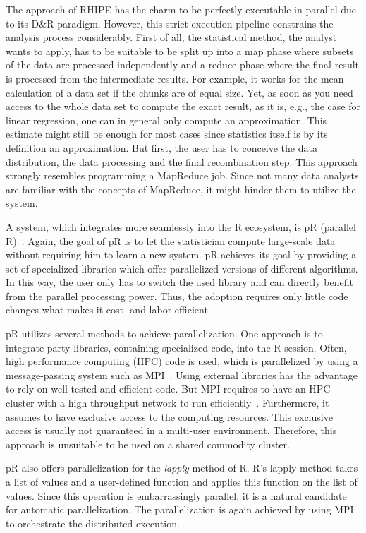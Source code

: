 The approach of RHIPE has the charm to be perfectly executable in parallel due to its D\&R paradigm.
However, this strict execution pipeline constrains the analysis process considerably.
First of all, the statistical method, the analyst wants to apply, has to be suitable to be split up into a map phase where subsets of the data are processed independently and a reduce phase where the final result is processed from the intermediate results.
For example, it works for the mean calculation of a data set if the chunks are of equal size.
Yet, as soon as you need access to the whole data set to compute the exact result, as it is, e.g., the case for linear regression, one can in general only compute an approximation.
This estimate might still be enough for most cases since statistics itself is by its definition an approximation.
But first, the user has to conceive the data distribution, the data processing and the final recombination step.
This approach strongly resembles programming a MapReduce job.
Since not many data analysts are familiar with the concepts of MapReduce, it might hinder them to utilize the system.

A system, which integrates more seamlessly into the R ecosystem, is pR (parallel R)~\cite{samatova:2009a}.
Again, the goal of pR is to let the statistician compute large-scale data without requiring him to learn a new system.
pR achieves its goal by providing a set of specialized libraries which offer parallelized versions of different algorithms.
In this way, the user only has to switch the used library and can directly benefit from the parallel processing power.
Thus, the adoption requires only little code changes what makes it cost- and labor-efficient.

pR utilizes several methods to achieve parallelization.
One approach is to integrate  party libraries, containing specialized code, into the R session.
Often, high performance computing (HPC) code is used, which is parallelized by using a message-passing system such as MPI~\cite{gropp:pc1996a,lusk:2009a}.
Using external libraries has the advantage to rely on well tested and efficient code.
But MPI requires to have an HPC cluster with a high throughput network to run efficiently~\cite{sur:2006a}.
Furthermore, it assumes to have exclusive access to the computing resources.
This exclusive access is usually not guaranteed in a multi-user environment.
Therefore, this approach is unsuitable to be used on a shared commodity cluster.

pR also offers parallelization for the \emph{lapply} method of R.
R's lapply method takes a list of values and a user-defined function and applies this function on the list of values.
Since this operation is embarrassingly parallel, it is a natural candidate for automatic parallelization.
The parallelization is again achieved by using MPI to orchestrate the distributed execution.

